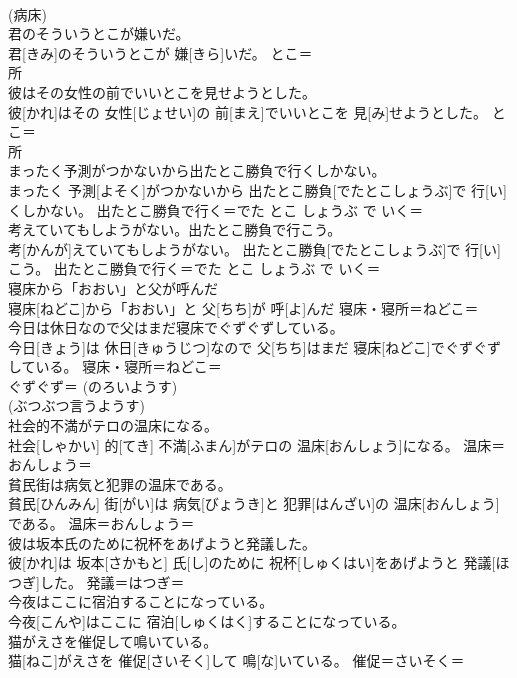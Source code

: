 \documentclass[8pt]{extreport}
\begin{document}
\begin{CJK}{UTF8}{min}
{\\	(病床) 
\\	君のそういうとこが嫌いだ。	
\\	君[きみ]のそういうとこが 嫌[きら]いだ。	とこ＝ 
\\	所
\\	彼はその女性の前でいいとこを見せようとした。	
\\	彼[かれ]はその 女性[じょせい]の 前[まえ]でいいとこを 見[み]せようとした。	とこ＝ 
\\	所
\\	まったく予測がつかないから出たとこ勝負で行くしかない。	
\\	まったく 予測[よそく]がつかないから 出たとこ勝負[でたとこしょうぶ]で 行[い]くしかない。	出たとこ勝負で行く＝でた とこ しょうぶ で いく＝ 
\\	考えていてもしようがない。出たとこ勝負で行こう。	
\\	考[かんが]えていてもしようがない。 出たとこ勝負[でたとこしょうぶ]で 行[い]こう。	出たとこ勝負で行く＝でた とこ しょうぶ で いく＝ 
\\	寝床から「おおい」と父が呼んだ	
\\	寝床[ねどこ]から「おおい」と 父[ちち]が 呼[よ]んだ	寝床・寝所＝ねどこ＝ 
\\	今日は休日なので父はまだ寝床でぐずぐずしている。	
\\	今日[きょう]は 休日[きゅうじつ]なので 父[ちち]はまだ 寝床[ねどこ]でぐずぐずしている。	寝床・寝所＝ねどこ＝ 
\\	ぐずぐず＝ (のろいようす) 
\\	(ぶつぶつ言うようす)
\\	社会的不満がテロの温床になる。	
\\	社会[しゃかい] 的[てき] 不満[ふまん]がテロの 温床[おんしょう]になる。	温床＝おんしょう＝ 
\\	貧民街は病気と犯罪の温床である。	
\\	貧民[ひんみん] 街[がい]は 病気[びょうき]と 犯罪[はんざい]の 温床[おんしょう]である。	温床＝おんしょう＝ 
\\	彼は坂本氏のために祝杯をあげようと発議した。	
\\	彼[かれ]は 坂本[さかもと] 氏[し]のために 祝杯[しゅくはい]をあげようと 発議[ほつぎ]した。	発議＝はつぎ＝ 
\\	今夜はここに宿泊することになっている。	
\\	今夜[こんや]はここに 宿泊[しゅくはく]することになっている。	
\\	猫がえさを催促して鳴いている。	
\\	猫[ねこ]がえさを 催促[さいそく]して 鳴[な]いている。	催促＝さいそく＝ 
}
\end{CJK}
\end{document}
